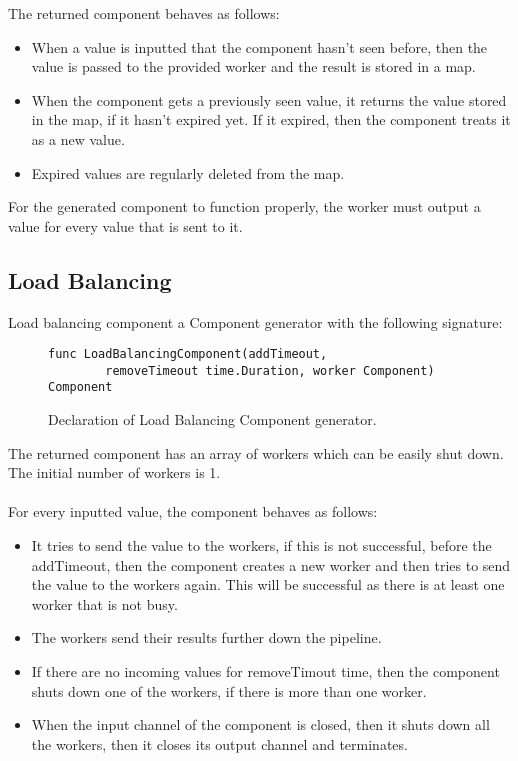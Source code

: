 \documentclass[12pt,a4paper]{article}
\begin{document}
The returned component behaves as follows:
\begin{itemize}
	\item When a value is inputted that the component hasn't seen before, then
				the value is passed to the provided worker and the result is stored in
				a map.
	\item When the component gets a previously seen value, it returns the value
			  stored in the map, if it hasn't expired yet. If it expired, then the component
				treats it as a new value.
	\item Expired values are regularly deleted from the map.
\end{itemize}

For the generated component to function properly, the worker must output
a value for every value that is sent to it.

\subsection{Load Balancing}
Load balancing component a Component generator with the following signature:

\begin{figure}[h]
\centering
\begin{lstlisting}
func LoadBalancingComponent(addTimeout, 
		removeTimeout time.Duration, worker Component) Component
\end{lstlisting}
\caption[scale=1.0]{Declaration of Load Balancing Component generator.}
\label{fig:loadComp}
\end{figure}

The returned component has an array of workers which can be easily shut down.
The initial number of workers is 1. 
\\
\\
For every inputted value, the component behaves as follows:
\begin{itemize}
	\item It tries to send the value to the workers, if this is not successful, 
				before the addTimeout, then the component creates a new worker and then
				tries to send the value to the workers again. This will be successful as
				there is at least one worker that is not busy.
	\item The workers send their results further down the pipeline.
	\item If there are no incoming values for removeTimout time, then the component
				shuts down one of the workers, if there is more than one worker.
	\item When the input channel of the component is closed, then it shuts down all
				the workers, then it closes its output channel and terminates.

\end{itemize}
\end{document}
